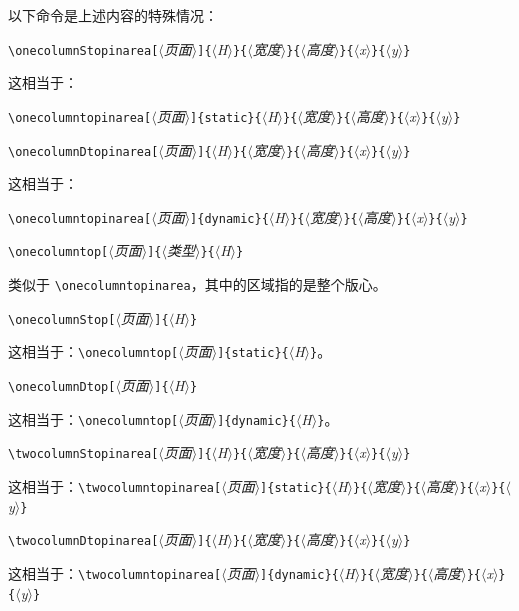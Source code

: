 \documentclass[a4paper]{book}%
\newcommand{\meta}[1]{\textnormal{\ensuremath{\langle}\makebox[0pt][l]{}\emph{#1}\makebox[0pt][l]{}\ensuremath{\rangle}}}
\begin{document}
以下命令是上述内容的特殊情况：
\begin{mdframed}
    \verb|\onecolumnStopinarea[|\meta{页面}\verb|]{|\meta{H}\verb|}{|\meta{宽度}\verb|}{|\meta{高度}\verb|}{|\meta{x}\verb|}{|\meta{y}\verb|}|
\end{mdframed}
这相当于：
\begin{mdframed}[backgroundcolor=white]
    \verb|\onecolumntopinarea[|\meta{页面}\verb|]{static}{|\meta{H}\verb|}{|\meta{宽度}\verb|}{|\meta{高度}\verb|}{|\meta{x}\verb|}{|\meta{y}\verb|}|
\end{mdframed}
\begin{mdframed}
    \verb|\onecolumnDtopinarea[|\meta{页面}\verb|]{|\meta{H}\verb|}{|\meta{宽度}\verb|}{|\meta{高度}\verb|}{|\meta{x}\verb|}{|\meta{y}\verb|}|
\end{mdframed}
这相当于：
\begin{mdframed}[backgroundcolor=white]
    \verb|\onecolumntopinarea[|\meta{页面}\verb|]{dynamic}{|\meta{H}\verb|}{|\meta{宽度}\verb|}{|\meta{高度}\verb|}{|\meta{x}\verb|}{|\meta{y}\verb|}|
\end{mdframed}
\begin{mdframed}
    \verb|\onecolumntop[|\meta{页面}\verb|]{|\meta{类型}\verb|}{|\meta{H}\verb|}|
\end{mdframed}
类似于 \verb|\onecolumntopinarea|，其中的区域指的是整个版心。
\begin{mdframed}
    \verb|\onecolumnStop[|\meta{页面}\verb|]{|\meta{H}\verb|}|
\end{mdframed}
这相当于：\verb|\onecolumntop[|\meta{页面}\verb|]{static}{|\meta{H}\verb|}|。
\begin{mdframed}
    \verb|\onecolumnDtop[|\meta{页面}\verb|]{|\meta{H}\verb|}|
\end{mdframed}
这相当于：\verb|\onecolumntop[|\meta{页面}\verb|]{dynamic}{|\meta{H}\verb|}|。
\begin{mdframed}
    \verb|\twocolumnStopinarea[|\meta{页面}\verb|]{|\meta{H}\verb|}{|\meta{宽度}\verb|}{|\meta{高度}\verb|}{|\meta{x}\verb|}{|\meta{y}\verb|}|
\end{mdframed}
这相当于：\verb|\twocolumntopinarea[|\meta{页面}\verb|]{static}{|\meta{H}\verb|}{|\meta{宽度}\verb|}{|\meta{高度}\verb|}{|\meta{x}\verb|}{|\meta{y}\verb|}|
\begin{mdframed}
    \verb|\twocolumnDtopinarea[|\meta{页面}\verb|]{|\meta{H}\verb|}{|\meta{宽度}\verb|}{|\meta{高度}\verb|}{|\meta{x}\verb|}{|\meta{y}\verb|}|
\end{mdframed}
这相当于：\verb|\twocolumntopinarea[|\meta{页面}\verb|]{dynamic}{|\meta{H}\verb|}{|\meta{宽度}\verb|}{|\meta{高度}\verb|}{|\meta{x}\verb|}{|\meta{y}\verb|}|
\end{document}
